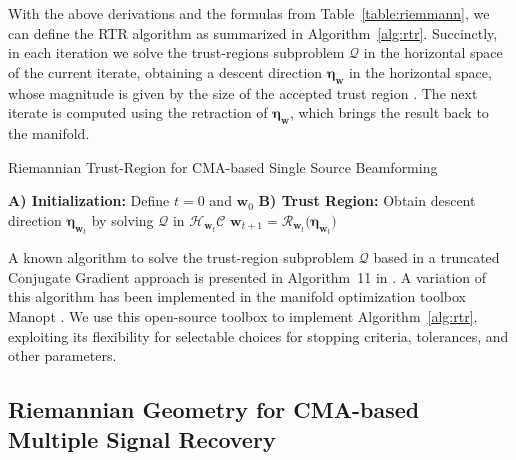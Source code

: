 With the above derivations and the formulas from Table~\ref{table:riemmann}, we can define the RTR algorithm as summarized in Algorithm~\ref{alg:rtr}. Succinctly, in each iteration we solve the trust-regions subproblem $\mathcal{Q}$ in the horizontal space of the current iterate, obtaining a descent direction $\bm{\eta}_{\bm{w}}$ in the horizontal space, whose magnitude is given by the size of the accepted trust region \cite{Absil2008book}. The next iterate is computed using the retraction of $\bm{\eta}_{\bm{w}}$, which brings the result back to the manifold.
\begin{algorithm}[H]
	\caption{Riemannian Trust-Region for CMA-based Single Source Beamforming}
	\label{alg:rtr}
	\begin{algorithmic}[1]
		\Statex \textbf{A) Initialization:} 
		\State Define $t=0$ and $\displaystyle \bm{w}_0$
		\Statex \textbf{B) Trust Region:}
		\State Obtain descent direction $\bm{\eta}_{\bm{w}_t}$ by solving $\mathcal{Q}$ in $\mathcal{H}_{\bm{w}_t}\mathcal{C}$
		\State $\displaystyle \bm{w}_{t+1}=\mathcal{R}_{\bm{w}_t}\big(\bm{\eta}_{\bm{w}_t}\big)$
		\EndWhile
	\end{algorithmic}
\end{algorithm}

A known algorithm to solve the trust-region subproblem $\mathcal{Q}$ based in a truncated Conjugate Gradient approach is presented in Algorithm~11 in \cite[Section 7.3]{Absil2008book}. A variation of this algorithm has been implemented in the manifold optimization toolbox Manopt \cite{manopt}. We use this open-source toolbox to implement Algorithm~\ref{alg:rtr}, exploiting its flexibility for selectable choices for stopping criteria, tolerances, and other parameters.

\subsection{Riemannian Geometry for CMA-based Multiple Signal Recovery}


